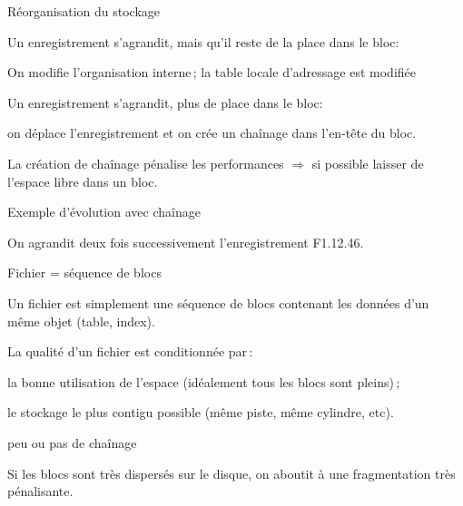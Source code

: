 \begin{frame}{Réorganisation du stockage}

\alert{Un enregistrement s'agrandit, mais qu'il reste
                de la place dans le bloc}:

\begin{redbullet}
  \item On modifie l'organisation interne\,; la table \alert{locale} d'adressage est modifiée 
\end{redbullet}

\vfill
\alert{Un enregistrement s'agrandit, plus de place dans le bloc}:
\begin{redbullet}
   \item on   déplace l'enregistrement  et on crée un \alert{chaînage
                  dans l'en-tête du bloc}.
\end{redbullet}

\vfill
\begin{blocgauche}
La création de chaînage pénalise les performances
$\Rightarrow$ si possible laisser de l'espace libre 
dans un bloc.
\end{blocgauche}
\end{frame}

\begin{frame}{Exemple d'évolution avec chaînage}




\vfill
\begin{blocgauche}
On agrandit deux fois successivement l'enregistrement
F1.12.46.
\end{blocgauche}

\end{frame}



\begin{frame}{Fichier = séquence de blocs}

Un fichier est simplement une séquence de blocs contenant
les données d'un même objet (table, index).

\vfill

La qualité d'un fichier est conditionnée par\,:

\begin{redbullet}
   \item la bonne utilisation de l'espace (idéalement
                  tous les blocs sont pleins)\,;

  \item le stockage le plus contigu possible (même piste,
            même cylindre, etc).
   \item peu ou pas de chaînage
\end{redbullet}

\vfill

\begin{blocgauche}
Si les blocs sont très dispersés sur le disque, on
aboutit à une \alert{fragmentation} très pénalisante.
\end{blocgauche}

\end{frame}

